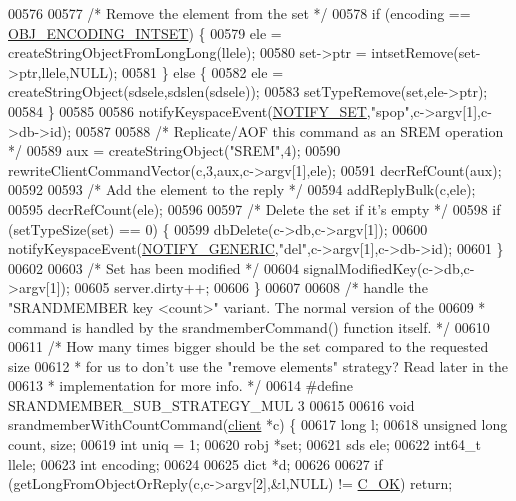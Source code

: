\begin{DoxyCode}
00576 
00577     \textcolor{comment}{/* Remove the element from the set */}
00578     \textcolor{keywordflow}{if} (encoding == \hyperlink{server_8h_a214173987de21c3b7661fddd42b05873}{OBJ\_ENCODING\_INTSET}) \{
00579         ele = createStringObjectFromLongLong(llele);
00580         set->ptr = intsetRemove(set->ptr,llele,NULL);
00581     \} \textcolor{keywordflow}{else} \{
00582         ele = createStringObject(sdsele,sdslen(sdsele));
00583         setTypeRemove(set,ele->ptr);
00584     \}
00585 
00586     notifyKeyspaceEvent(\hyperlink{server_8h_a625aec945b2152a46979b1b21f2af274}{NOTIFY\_SET},\textcolor{stringliteral}{"spop"},c->argv[1],c->db->id);
00587 
00588     \textcolor{comment}{/* Replicate/AOF this command as an SREM operation */}
00589     aux = createStringObject(\textcolor{stringliteral}{"SREM"},4);
00590     rewriteClientCommandVector(c,3,aux,c->argv[1],ele);
00591     decrRefCount(aux);
00592 
00593     \textcolor{comment}{/* Add the element to the reply */}
00594     addReplyBulk(c,ele);
00595     decrRefCount(ele);
00596 
00597     \textcolor{comment}{/* Delete the set if it's empty */}
00598     \textcolor{keywordflow}{if} (setTypeSize(set) == 0) \{
00599         dbDelete(c->db,c->argv[1]);
00600         notifyKeyspaceEvent(\hyperlink{server_8h_a9fa53dd1068e62365f3964ad3479eec2}{NOTIFY\_GENERIC},\textcolor{stringliteral}{"del"},c->argv[1],c->db->id);
00601     \}
00602 
00603     \textcolor{comment}{/* Set has been modified */}
00604     signalModifiedKey(c->db,c->argv[1]);
00605     server.dirty++;
00606 \}
00607 
00608 \textcolor{comment}{/* handle the "SRANDMEMBER key <count>" variant. The normal version of the}
00609 \textcolor{comment}{ * command is handled by the srandmemberCommand() function itself. */}
00610 
00611 \textcolor{comment}{/* How many times bigger should be the set compared to the requested size}
00612 \textcolor{comment}{ * for us to don't use the "remove elements" strategy? Read later in the}
00613 \textcolor{comment}{ * implementation for more info. */}
00614 \textcolor{preprocessor}{#}\textcolor{preprocessor}{define} \textcolor{preprocessor}{SRANDMEMBER\_SUB\_STRATEGY\_MUL} 3
00615 
00616 \textcolor{keywordtype}{void} srandmemberWithCountCommand(\hyperlink{structclient}{client} *c) \{
00617     \textcolor{keywordtype}{long} l;
00618     \textcolor{keywordtype}{unsigned} \textcolor{keywordtype}{long} count, size;
00619     \textcolor{keywordtype}{int} uniq = 1;
00620     robj *set;
00621     sds ele;
00622     int64\_t llele;
00623     \textcolor{keywordtype}{int} encoding;
00624 
00625     dict *d;
00626 
00627     \textcolor{keywordflow}{if} (getLongFromObjectOrReply(c,c->argv[2],&l,NULL) != \hyperlink{server_8h_a303769ef1065076e68731584e758d3e1}{C\_OK}) \textcolor{keywordflow}{return};

\end{DoxyCode}

